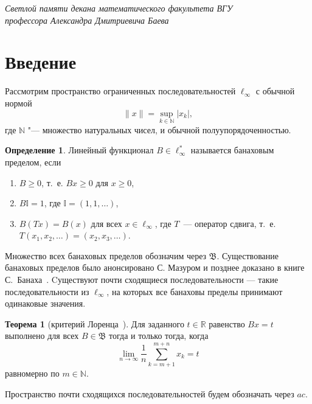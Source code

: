 \documentclass[a4paper,openbib]{article}
\theoremstyle{definition}
\newtheorem{theorem}[lemma]{Теорема}
\newtheorem{definition}[lemma]{Определение}
\begin{document}
\newpage

\begin{flushright}
	\textit{
		Светлой памяти
		декана математического факультета ВГУ
		\\
		профессора
		Александра Дмитриевича Баева
	}
\end{flushright}

\section{Введение}

Рассмотрим пространство ограниченных последовательностей $\ell_\infty$ с обычной нормой
\begin{equation*}
	\|x\| = \sup_{k\in\mathbb{N}} |x_k|
	,
\end{equation*}
где $\mathbb{N}$ "--- множество натуральных чисел,
и обычной полуупорядоченностью.


\begin{definition}
	Линейный функционал $B\in \ell_\infty^*$ называется банаховым пределом,
	если
	\begin{enumerate}[label=(\roman*)]
		\item
			$B\geq0$, т.~е. $Bx \geq 0$ для $x \geq 0$,
		\item
			$B\mathbb{I}=1$, где $\mathbb{I} =(1,1,\ldots)$,
		\item
			$B(Tx)=B(x)$ для всех $x\in \ell_\infty$, где $T$~---
		оператор сдвига, т.~е. $T(x_1,x_2,\ldots)=(x_2,x_3,\ldots)$.
	\end{enumerate}
\end{definition}
Множество всех банаховых пределов обозначим через $\mathfrak{B}$.
Существование банаховых пределов было анонсировано С. Мазуром \cite{Mazur} и позднее доказано в книге С.~Банаха~\cite{banach1993theorie}.
%
Cуществуют почти сходящиеся последовательности ---
такие последовательности из $\ell_\infty$,
на которых все банаховы пределы принимают одинаковые значения.
\begin{theorem}[критерий Лоренца~\cite{lorentz1948contribution}]
	Для заданного $t\in\mathbb{R}$ равенство $Bx=t$ выполнено для всех $B\in\mathfrak{B}$
	тогда и только тогда, когда
	\begin{equation}
		\label{eq:crit_Lorentz}
		\lim_{n\to\infty} \frac{1}{n} \sum_{k=m+1}^{m+n} x_k = t
	\end{equation}
	равномерно по $m\in\mathbb{N}$.
\end{theorem}


Пространство почти сходящихся последовательностей будем обозначать через $ac$.
\end{document}
